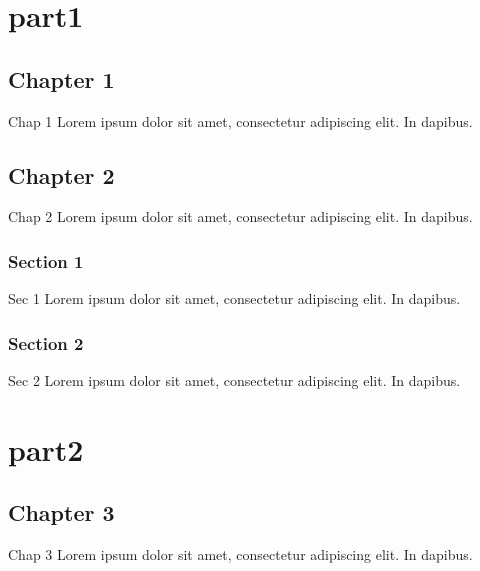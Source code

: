 \part{part1}


\chapter{Chapter 1}
\label{\detokenize{part1/chap1:chapter-1}}\label{\detokenize{part1/chap1::doc}}
\sphinxAtStartPar
Chap 1 Lorem ipsum dolor sit amet, consectetur adipiscing elit. In dapibus.


\chapter{Chapter 2}
\label{\detokenize{part1/chap2:chapter-2}}\label{\detokenize{part1/chap2::doc}}
\sphinxAtStartPar
Chap 2 Lorem ipsum dolor sit amet, consectetur adipiscing elit. In dapibus.

\sphinxAtStartPar


\sphinxAtStartPar
{}


\section{Section 1}
\label{\detokenize{part1/sec1:section-1}}\label{\detokenize{part1/sec1::doc}}
\sphinxAtStartPar
Sec 1 Lorem ipsum dolor sit amet, consectetur adipiscing elit. In dapibus.


\section{Section 2}
\label{\detokenize{part1/sec2:section-2}}\label{\detokenize{part1/sec2::doc}}
\sphinxAtStartPar
Sec 2 Lorem ipsum dolor sit amet, consectetur adipiscing elit. In dapibus.


\part{part2}


\chapter{Chapter 3}
\label{\detokenize{part2/chap3:chapter-3}}\label{\detokenize{part2/chap3::doc}}
\sphinxAtStartPar
Chap 3 Lorem ipsum dolor sit amet, consectetur adipiscing elit. In dapibus.


